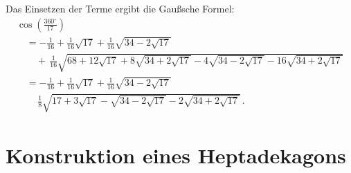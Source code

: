 \clearpage

Das Einsetzen der Terme ergibt die Gaußsche Formel:
\[
\begin{array}{l}
\displaystyle
\cos\left(\frac{360^\circ}{17}\right) \\[12pt]
\displaystyle
\quad=-\frac{1}{16}+\frac{1}{16}\sqrt{17} + 
     \frac{1}{16}\sqrt{34-2\sqrt{17}} \\[12pt]
\displaystyle
     \quad\quad+\,\frac{1}{16}\sqrt{
     68+12\sqrt{17} + 
     8\sqrt{34+2\sqrt{17}}-4\sqrt{34-2\sqrt{17}}
   -16
     \sqrt{34+2\sqrt{17}}
   }\\[12pt]
\displaystyle
\quad=-\frac{1}{16}+\frac{1}{16}\sqrt{17} + 
     \frac{1}{16}\sqrt{34-2\sqrt{17}}\\[12pt]
\displaystyle
\quad\quad\,\frac{1}{8}\sqrt{
     17+3\sqrt{17} - 
     \sqrt{34-2\sqrt{17}}
   -2
     \sqrt{34+2\sqrt{17}}
   }\,.
\end{array}
\]

\section{Konstruktion eines Heptadekagons}\label{s.construction}



